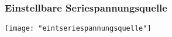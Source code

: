 \subsubsection{Einstellbare Seriespannungsquelle}
\begin{minipage}[t]{0.3\textwidth}
	\vspace{0pt}								%
	\texttt{[image: "eintseriespannungsquelle"]}
\end{minipage}\hspace{0.05\textwidth}
\begin{minipage}[t]{0.65\textwidth}
	\vspace{0pt}								%
\end{minipage}
\vspace{2mm}